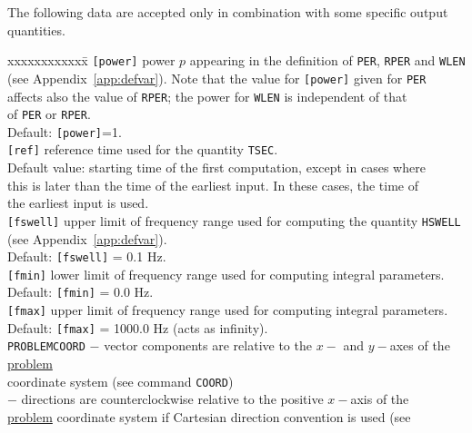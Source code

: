 \documentclass[12pt]{book}
\begin{document}
The following data are accepted only in combination with some specific output quantities.
\begin{tabbing}
 xxxxxxxxxxxx\= \kill
{\tt [power]}      \> power $p$ appearing in the definition of {\tt PER}, {\tt RPER} and {\tt WLEN}\+\\
                     (see Appendix~\ref{app:defvar}). Note that the value for {\tt [power]} given for {\tt PER}\\
                      affects also the value of {\tt RPER}; the power for {\tt WLEN} is independent of that\\
                      of {\tt PER} or {\tt RPER}.\\
                      Default: {\tt [power]}=1.\-\\
{\tt [ref]}        \> reference time used for the quantity {\tt TSEC}.\+\\
                      Default value: starting time of the first computation, except in cases where\\
                      this is later than the time of the earliest input. In these cases, the time of\\
                      the earliest input is used.\-\\
{\tt [fswell]}     \> upper limit of frequency range used for computing the quantity {\tt HSWELL}\+\\
                      (see Appendix~\ref{app:defvar}).\\
                      Default: {\tt [fswell]} = 0.1 Hz.\-\\
{\tt [fmin]}       \> lower limit of frequency range used for computing integral parameters.\+\\
                      Default: {\tt [fmin]} = 0.0 Hz.\-\\
{\tt [fmax]}       \> upper limit of frequency range used for computing integral parameters.\+\\
                      Default: {\tt [fmax]} = 1000.0 Hz (acts as infinity).\-\\
{\tt PROBLEMCOORD} \> $-$ vector components are relative to the $x-$ and $y-$axes of the \underline{problem}\+\\
                      coordinate system (see command {\tt COORD})\\
                      $-$ directions are counterclockwise relative to the positive $x-$axis of the\\
                      \underline{problem} coordinate system if Cartesian direction convention is used (see\\

\end{tabbing}
\end{document}

